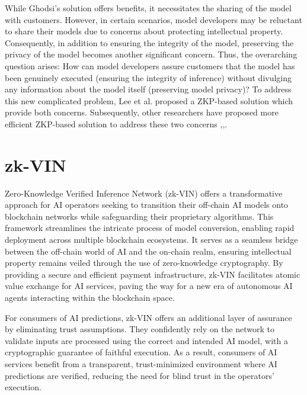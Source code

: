 \documentclass[conference]{IEEEtran}
\begin{document}
While Ghodsi's solution offers benefits, it necessitates the sharing of the model with customers. However, in certain scenarios, model developers may be reluctant to share their models due to concerns about protecting intellectual property. Consequently, in addition to ensuring the integrity of the model, preserving the privacy of the model becomes another significant concern. Thus, the overarching question arises: How can model developers assure customers that the model has been genuinely executed (ensuring the integrity of inference) without divulging any information about the model itself (preserving model privacy)? To address this new complicated problem, Lee et al. proposed a ZKP-based solution which provide both concerns. Subsequently, other researchers have proposed more efficient ZKP-based solution to address these two concerns ,,.




\section{zk-VIN}
Zero-Knowledge Verified Inference Network (zk-VIN) offers a transformative approach for AI operators seeking to transition their off-chain AI models onto blockchain networks while safeguarding their proprietary algorithms. This framework streamlines the intricate process of model conversion, enabling rapid deployment across multiple blockchain ecosystems. It serves as a seamless bridge between the off-chain world of AI and the on-chain realm, ensuring intellectual property remains veiled through the use of zero-knowledge cryptography. By providing a secure and efficient payment infrastructure, zk-VIN facilitates atomic value exchange for AI services, paving the way for a new era of autonomous AI agents interacting within the blockchain space.

For consumers of AI predictions, zk-VIN offers an additional layer of assurance by eliminating trust assumptions. They confidently rely on the network to validate inputs are processed using the correct and intended AI model, with a cryptographic guarantee of faithful execution.  As a result, consumers of AI services benefit from a transparent, trust-minimized environment where AI predictions are verified, reducing the need for blind trust in the operators' execution.
\end{document}
